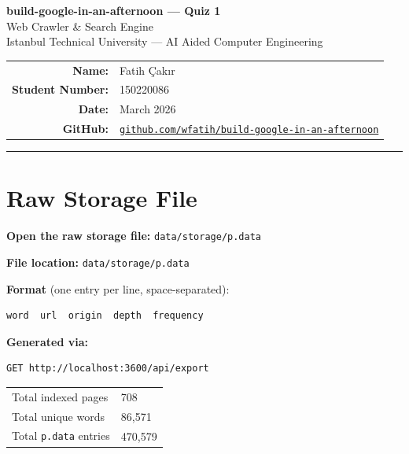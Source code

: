 \documentclass[12pt,a4paper]{article}
\newenvironment{answerbox}{%
  \begin{mdframed}[
    backgroundcolor=lightaccent,
    linecolor=accent,
    linewidth=1pt,
    innerleftmargin=10pt,
    innerrightmargin=10pt,
    innertopmargin=8pt,
    innerbottommargin=8pt,
  ]%
}{\end{mdframed}}
\begin{document}
\begin{center}
  {\LARGE\bfseries\color{accent} build-google-in-an-afternoon — Quiz 1}\\[6pt]
  {\large Web Crawler \& Search Engine}\\[4pt]
  {\normalsize Istanbul Technical University — AI Aided Computer Engineering}\\[6pt]
  \begin{tabular}{rl}
    \textbf{Name:}           & Fatih Çakır \\
    \textbf{Student Number:} & 150220086 \\
    \textbf{Date:}           & March 2026 \\
    \textbf{GitHub:}         & \href{https://github.com/wfatih/build-google-in-an-afternoon}{\texttt{github.com/wfatih/build-google-in-an-afternoon}} \\
  \end{tabular}
\end{center}

\vspace{0.8em}
\noindent\rule{\linewidth}{1pt}
\vspace{0.3em}

\section{Raw Storage File}

\textbf{Open the raw storage file:} \texttt{data/storage/p.data}

\begin{answerbox}
\textbf{File location:} \texttt{data/storage/p.data}

\medskip
\textbf{Format} (one entry per line, space-separated):
\begin{lstlisting}[style=inline]
word  url  origin  depth  frequency
\end{lstlisting}

\textbf{Generated via:}
\begin{lstlisting}[style=inline]
GET http://localhost:3600/api/export
\end{lstlisting}

\begin{tabular}{ll}
  Total indexed pages  & 708 \\
  Total unique words   & 86{,}571 \\
  Total \texttt{p.data} entries & 470{,}579 \\
\end{tabular}
\end{answerbox}
\end{document}

